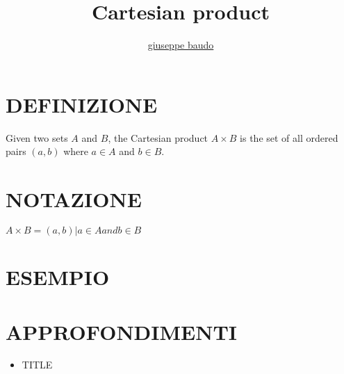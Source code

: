 \documentclass[a4paper,10pt]{article}
\title{Cartesian product}
\author{\href{http://www.baudo.hol.es}{giuseppe baudo}}
\begin{document}
\maketitle

\section{DEFINIZIONE}
Given two sets $A$ and $B$, the Cartesian product $A \times B$ is the set of all ordered pairs $(a,b)$ where $a \in A$ and 
$b \in B$.

\section{NOTAZIONE}
$A \times B = {(a,b) | a \in A and b \in B }$
\section{ESEMPIO}

\section{APPROFONDIMENTI}
\begin{itemize}
 \item TITLE
\end{itemize}
\end{document}
